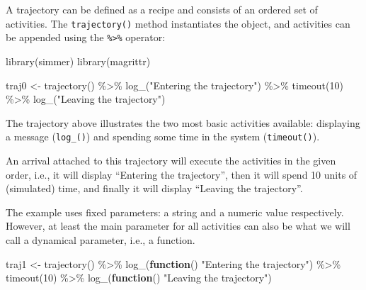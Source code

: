 \documentclass[
]{book}
\newenvironment{Shaded}{\begin{snugshade}}{\end{snugshade}}
\newcommand{\ControlFlowTok}[1]{\textcolor[rgb]{0.13,0.29,0.53}{\textbf{#1}}}
\newcommand{\DecValTok}[1]{\textcolor[rgb]{0.00,0.00,0.81}{#1}}
\newcommand{\FunctionTok}[1]{\textcolor[rgb]{0.00,0.00,0.00}{#1}}
\newcommand{\NormalTok}[1]{#1}
\newcommand{\OtherTok}[1]{\textcolor[rgb]{0.56,0.35,0.01}{#1}}
\newcommand{\SpecialCharTok}[1]{\textcolor[rgb]{0.00,0.00,0.00}{#1}}
\newcommand{\StringTok}[1]{\textcolor[rgb]{0.31,0.60,0.02}{#1}}
\begin{document}
A trajectory can be defined as a recipe and consists of an ordered set of activities. The \texttt{trajectory()} method instantiates the object, and activities can be appended using the \texttt{\%\textgreater{}\%} operator:

\begin{Shaded}
\begin{Highlighting}[]
\FunctionTok{library}\NormalTok{(simmer)}
\FunctionTok{library}\NormalTok{(magrittr)}

\NormalTok{traj0 }\OtherTok{\textless{}{-}} \FunctionTok{trajectory}\NormalTok{() }\SpecialCharTok{\%\textgreater{}\%}
  \FunctionTok{log\_}\NormalTok{(}\StringTok{"Entering the trajectory"}\NormalTok{) }\SpecialCharTok{\%\textgreater{}\%}
  \FunctionTok{timeout}\NormalTok{(}\DecValTok{10}\NormalTok{) }\SpecialCharTok{\%\textgreater{}\%}
  \FunctionTok{log\_}\NormalTok{(}\StringTok{"Leaving the trajectory"}\NormalTok{)}
\end{Highlighting}
\end{Shaded}

The trajectory above illustrates the two most basic activities available: displaying a message (\texttt{log\_()}) and spending some time in the system (\texttt{timeout()}).

An arrival attached to this trajectory will execute the activities in the given order, i.e., it will display ``Entering the trajectory'', then it will spend 10 units of (simulated) time, and finally it will display ``Leaving the trajectory''.

The example uses fixed parameters: a string and a numeric value respectively. However, at least the main parameter for all activities can also be what we will call a dynamical parameter, i.e., a function.

\begin{Shaded}
\begin{Highlighting}[]
\NormalTok{traj1 }\OtherTok{\textless{}{-}} \FunctionTok{trajectory}\NormalTok{() }\SpecialCharTok{\%\textgreater{}\%}
  \FunctionTok{log\_}\NormalTok{(}\ControlFlowTok{function}\NormalTok{() }\StringTok{"Entering the trajectory"}\NormalTok{) }\SpecialCharTok{\%\textgreater{}\%}
  \FunctionTok{timeout}\NormalTok{(}\DecValTok{10}\NormalTok{) }\SpecialCharTok{\%\textgreater{}\%}
  \FunctionTok{log\_}\NormalTok{(}\ControlFlowTok{function}\NormalTok{() }\StringTok{"Leaving the trajectory"}\NormalTok{)}
\end{Highlighting}
\end{Shaded}
\end{document}
